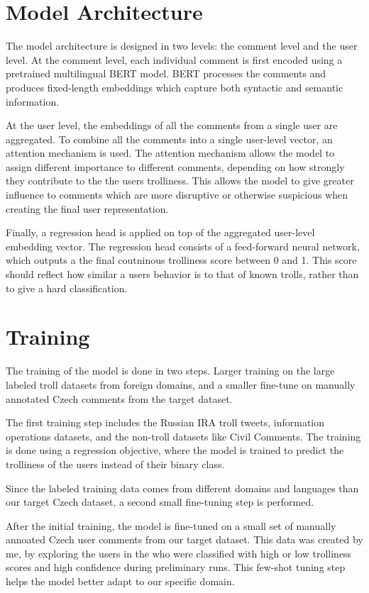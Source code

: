 \documentclass[twoside]{ctuthesis}
\theoremstyle{plain}
\theoremstyle{definition}
\theoremstyle{note}
\begin{document}
\section{Model Architecture}
The model architecture is designed in two levels: the comment level and the user level. At the comment level, each individual comment is first encoded using a pretrained multilingual BERT model. BERT processes the comments and produces fixed-length embeddings which capture both syntactic and semantic information.\par
At the user level, the embeddings of all the comments from a single user are aggregated. To combine all the comments into a single user-level vector, an attention mechanism is used. The attention mechanism allows the model to assign different importance to different comments, depending on how strongly they contribute to the the users trolliness. This allows the model to give greater influence to comments which are more disruptive or otherwise suspicious when creating the final user representation.\par
Finally, a regression head is applied on top of the aggregated user-level embedding vector. The regression head consists of a feed-forward neural network, which outputs a the final coutninous trolliness score between 0 and 1. This score should reflect how similar a users behavior is to that of known trolls, rather than to give a hard classification.\par

\section{Training}
The training of the model is done in two steps. Larger training on the large labeled troll datasets from foreign domains, and a smaller fine-tune on manually annotated Czech comments from the target dataset.\par
The first training step includes the Russian IRA troll tweets, information operations datasets, and the non-troll datasets like Civil Comments. The training is done using a regression objective, where the model is trained to predict the trolliness of the users instead of their binary class.\par
Since the labeled training data comes from different domains and languages than our target Czech dataset, a second small fine-tuning step is performed.\par
After the initial training, the model is fine-tuned on a small set of manually annoated Czech user comments from our target dataset. This data was created by me, by exploring the users in the who were classified with high or low trolliness scores and high confidence during preliminary runs. This few-shot tuning step helps the model better adapt to our specific domain.\par
\end{document}
